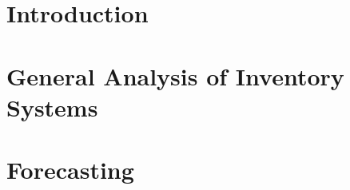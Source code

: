\section{Introduction}
\label{sec:introduction}


\section{General Analysis of Inventory Systems}
\label{sec:general}


\section{Forecasting}
\label{sec:forecast}


%
%
%
%
%
%
%
%


